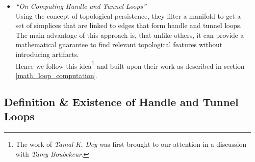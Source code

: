 \begin{itemize}
	\item \citep[][]{Dey2007} \textit{``On Computing Handle and Tunnel Loops''}\\
Using the concept of topological persistence, they filter a manifold to get a set of simplices that are linked to edges that form handle and tunnel loops.
The main advantage of this approach is, that unlike others, it can provide a mathematical guarantee to find relevant topological features without introducing artifacts.\\
Hence we follow this idea\footnote{ The work of \textit{Tamal K. Dey} was first brought to our attention in a discussion with \textit{Tamy Boubekeur}.} and built upon their work as described in section \ref{math_loop_computation}.
\end{itemize}

\subsection{Definition \& Existence of Handle and Tunnel Loops}
\label{math_loop_definition}

